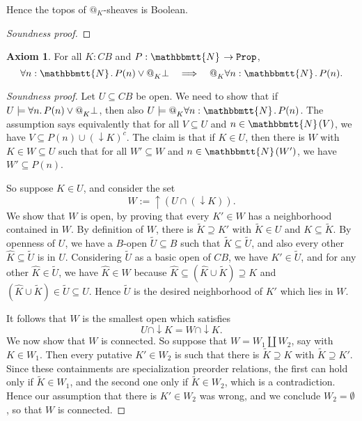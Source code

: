 \documentclass[11pt, oneside, article]{memoir}
\makeatletter
\newcommand{\tob}[1]{\todo[color=blue!40,inline]{\textbf{T:} #1}}
\theoremstyle{plain}
\theoremstyle{definition}
\newtheorem{axiom}{Axiom}
\theoremstyle{remark}
\newenvironment{soundproof}{\begin{proof}[Soundness proof]}{\end{proof}}
\renewcommand{\ss}{\subseteq}
\newcommand{\const}[1]{\mathtt{#1}}
\newcommand{\wt}[1]{\widetilde{#1}}
\newcommand{\wh}[1]{\widehat{#1}}
\newcommand{\internal}[1]{\raisebox{-.03ex}{$\mathbbmtt{#1}$}}
\newcommand{\hs}{\hspace{1.1pt}}
\newcommand{\tNN}{\internal{N}\hs}
\newcommand{\Prop}{\const{Prop}}
\newcommand{\BaseSpace}{B}
\newcommand{\CB}{C\BaseSpace}
\newcommand{\AtSymbol}{{@}}
\newcommand{\At}[2][]{\AtSymbol^{#1}_{#2}}
\makeatother
\begin{document}
Hence the topos of $\At{K}$-sheaves is Boolean.

\begin{soundproof}
	\tob{tbw}
\end{soundproof}

\begin{axiom}
	\label{ax.N_vs_at}
	For all $K:\CB$ and $P : \tNN \to \Prop$,
	\[
		\forall n : \tNN \ldotp P(n) \lor \At{K} \bot \quad \Longrightarrow \quad \At{K} \forall n : \tNN \ldotp P(n).
	\]
\end{axiom}

\begin{soundproof}
	Let $U\ss\CB$ be open. We need to show that if $U \models \forall n\ldotp P(n) \lor \At{K} \bot$, then also $U \models \At{K} \forall n : \tNN \ldotp P(n)$. The assumption says equivalently that for all $V\subseteq U$ and $n\in \tNN(V)$, we have $V \subseteq P(n) \cup (\downarrow K)^c$. The claim is that if $K\in U$, then there is $W$ with $K\in W \subseteq U$ such that for all $W'\subseteq W$ and $n\in\tNN(W')$, we have $W' \ss P(n)$.

	So suppose $K\in U$, and consider the set
	\[
		W := \uparrow (U \cap (\downarrow K)).
	\]
		We show that $W$ is open, by proving that every $K'\in W$ has a neighborhood contained in $W$. By definition of $W$, there is $\wt{K} \supseteq K'$ with $\wt{K} \in U$ and $K \subseteq \wt{K}$. By openness of $U$, we have a $B$-open $\wt{U} \subseteq B$ such that $\wt{K} \subseteq \wt{U}$, and also every other $\wh{K} \subseteq \wt{U}$ is in $U$. Considering $\wt{U}$ as a basic open of $\CB$, we have $K'\in\wt{U}$, and for any other $\wh{K}\in\wt{U}$, we have $\wh{K}\in W$ because $\wh{K}\ss(\wh{K}\cup\wt{K})\supseteq K$ and $(\wh{K}\cup\wt{K})\in\wt{U}\ss U$. Hence $\wt{U}$ is the desired neighborhood of $K'$ which lies in $W$.


	It follows that $W$ is the smallest open which satisfies 
	\begin{equation}
		\label{UKW}
		U \cap \downarrow K = W \cap \downarrow K.
	\end{equation}
	We now show that $W$ is connected. So suppose that $W = W_1 \amalg W_2$, say with $K\in W_1$. Then every putative $K' \in W_2$ is such that there is $\wt{K} \supseteq K$ with $\wt{K} \supseteq K'$. Since these containments are specialization preorder relations, the first can hold only if $\wt{K} \in W_1$, and the second one only if $\wt{K} \in W_2$, which is a contradiction. Hence our assumption that there is $K' \in W_2$ was wrong, and we conclude $W_2 = \emptyset$, so that $W$ is connected.


\end{soundproof}
\end{document}
